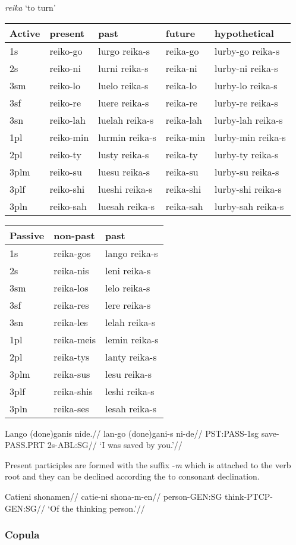 \documentclass[a4paper,]{article}
\begin{document}
\emph{reika} `to turn'

\begin{longtable}[]{@{}lllll@{}}
\toprule
Active & present & past & future & hypothetical\tabularnewline
\midrule
\endhead
1s & reiko-go & lurgo reika-s & reika-go & lurby-go
reika-s\tabularnewline
2s & reiko-ni & lurni reika-s & reika-ni & lurby-ni
reika-s\tabularnewline
3sm & reiko-lo & luelo reika-s & reika-lo & lurby-lo
reika-s\tabularnewline
3sf & reiko-re & luere reika-s & reika-re & lurby-re
reika-s\tabularnewline
3sn & reiko-lah & luelah reika-s & reika-lah & lurby-lah
reika-s\tabularnewline
1pl & reiko-min & lurmin reika-s & reika-min & lurby-min
reika-s\tabularnewline
2pl & reiko-ty & lusty reika-s & reika-ty & lurby-ty
reika-s\tabularnewline
3plm & reiko-su & luesu reika-s & reika-su & lurby-su
reika-s\tabularnewline
3plf & reiko-shi & lueshi reika-s & reika-shi & lurby-shi
reika-s\tabularnewline
3pln & reiko-sah & luesah reika-s & reika-sah & lurby-sah
reika-s\tabularnewline
\bottomrule
\end{longtable}

\begin{longtable}[]{@{}lll@{}}
\toprule
Passive & non-past & past\tabularnewline
\midrule
\endhead
1s & reika-gos & lango reika-s\tabularnewline
2s & reika-nis & leni reika-s\tabularnewline
3sm & reika-los & lelo reika-s\tabularnewline
3sf & reika-res & lere reika-s\tabularnewline
3sn & reika-les & lelah reika-s\tabularnewline
1pl & reika-meis & lemin reika-s\tabularnewline
2pl & reika-tys & lanty reika-s\tabularnewline
3plm & reika-sus & lesu reika-s\tabularnewline
3plf & reika-shis & leshi reika-s\tabularnewline
3pln & reika-ses & lesah reika-s\tabularnewline
\bottomrule
\end{longtable}

\ex \begingl \glpreamble Lango (done)ganis nide.// \gla lan-go
(done)gani-s ni-de// \glb PST:PASS-1sg save-PASS.PRT 2s-ABL:SG//
\glft `I was saved by you.'// \endgl \xe

Present participles are formed with the suffix -\emph{m} which is
attached to the verb root and they can be declined according the to
consonant declination.

\ex \begingl \glpreamble Catieni shonamen// \gla catie-ni shona-m-en//
\glb person-GEN:SG think-PTCP-GEN:SG// \glft `Of the thinking person.'//
\endgl \xe

\hypertarget{copula}{%
\subsubsection{Copula}\label{copula}}
\end{document}
